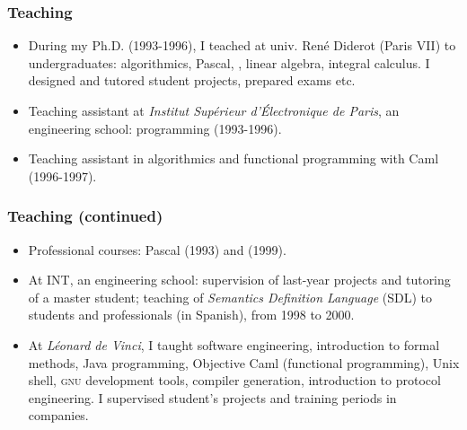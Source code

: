 \documentclass[compress,dvips,xcolor={dvipsnames},t]{beamer}
\begin{document}
%
\begin{frame}
\frametitle{Teaching}

\begin{itemize}

  \item During my Ph.D. (1993-1996), I teached at univ. René Diderot
  (Paris VII) to undergraduates: algorithmics, Pascal, \cpp, linear
  algebra, integral calculus. I designed and tutored student projects,
  prepared exams etc.

  \item Teaching assistant at \emph{Institut Supérieur d'Électronique
  de Paris}, an engineering school: \cpp{} programming (1993-1996).

  \item Teaching assistant in algorithmics and functional programming
  with Caml (1996-1997).

\end{itemize}

\end{frame}

%
\begin{frame}
\frametitle{Teaching (continued)}

\begin{itemize}

  \item Professional courses: Pascal (1993) and \cpp{} (1999).

  \item At INT, an engineering school: supervision of last-year
  projects and tutoring of a master student; teaching of
  \emph{Semantics Definition Language} (SDL) to students and
  professionals (in Spanish), from 1998 to 2000.

  \item At \emph{Léonard de Vinci}, I taught software engineering,
  introduction to formal methods, Java programming, Objective Caml
  (functional programming), Unix shell, \textsc{gnu} development
  tools, compiler generation, introduction to protocol engineering. I
  supervised student's projects and training periods in companies.

\end{itemize}

\end{frame}
\end{document}
